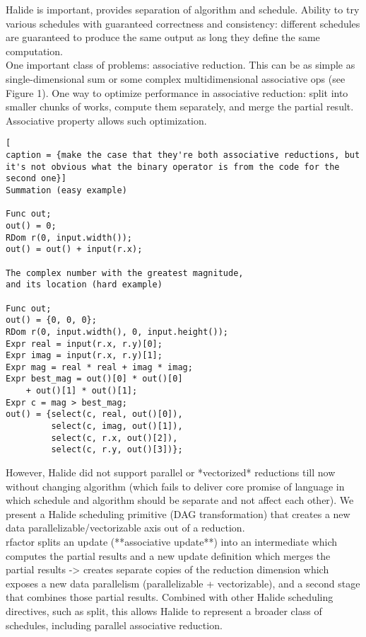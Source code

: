 Halide \cite{Ragan-Kelley:2013:HLC:2491956.2462176} is important, provides separation of algorithm and schedule. Ability to try various schedules with guaranteed correctness and consistency: different schedules are guaranteed to produce the same output as long they define the same computation. \\

One important class of problems: associative reduction. This can be as simple as single-dimensional sum or some complex multidimensional associative ops (see Figure 1). One way to optimize performance in associative reduction: split into smaller chunks of works, compute them separately, and merge the partial result. Associative property allows such optimization. \\

\begin{lstlisting}[
caption = {make the case that they're both associative reductions, but it's not obvious what the binary operator is from the code for the second one}]
Summation (easy example)

Func out;
out() = 0;
RDom r(0, input.width());
out() = out() + input(r.x);

The complex number with the greatest magnitude, 
and its location (hard example)

Func out;
out() = {0, 0, 0};
RDom r(0, input.width(), 0, input.height());
Expr real = input(r.x, r.y)[0];
Expr imag = input(r.x, r.y)[1];
Expr mag = real * real + imag * imag;
Expr best_mag = out()[0] * out()[0] 
	+ out()[1] * out()[1];
Expr c = mag > best_mag;
out() = {select(c, real, out()[0]),
         select(c, imag, out()[1]),
         select(c, r.x, out()[2]),
         select(c, r.y, out()[3])};
\end{lstlisting}

However, Halide did not support parallel or *vectorized* reductions till now without changing algorithm (which fails to deliver core promise of language in which schedule and algorithm should be separate and not affect each other). We present a Halide scheduling primitive (DAG transformation) that creates a new data parallelizable/vectorizable axis out of a reduction. \\

rfactor splits an update (**associative update**) into an intermediate which computes the partial results and a new update definition which merges the partial results -> creates separate copies of the reduction dimension which exposes a new data parallelism (parallelizable + vectorizable), and a second stage that combines those partial results. Combined with other Halide scheduling directives, such as split, this allows Halide to represent a broader class of schedules, including parallel associative reduction. 

